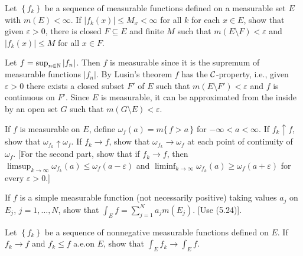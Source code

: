 \begin{problem}
  Let $\left\{f_k\right\}$ be a sequence of measurable functions defined on
  a measurable set $E$ with $m(E)<\infty$. If $|f_k(x)|\leq M_x<\infty$ for
  all $k$ for each $x\in E$, show that given $\varepsilon>0$, there is
  closed $F\subseteq E$ and finite $M$ such that
  $m(E\setminus F)<\varepsilon$ and $|f_k(x)|\leq M$ for all $x\in F$.
\end{problem}
\begin{solution}
  Let $f=\sup_{n\in\mathbb{N}}|f_n|$. Then $f$ is measurable since it is the
  supremum of measurable functions $|f_n|$. By Lusin's theorem $f$ has the
  $\mathcal{C}$-property, i.e., given $\varepsilon>0$ there exists a closed
  subset $F'$ of $E$ such that $m(E\setminus F')<\varepsilon$ and $f$ is
  continuous on $F'$. Since $E$ is measurable, it can be approximated from
  the inside by an open set $G$ such that $m(G\setminus E)<\varepsilon$.
\end{solution}

\begin{problem}
  If $f$ is measurable on $E$, define
  $\omega_f(a)=m\{\,f>a\,\}$ for $-\infty<a<\infty$. If
  $f_k\uparrow f$, show that $\omega_{f_k}\uparrow\omega_f$. If $f_k\to f$,
  show that $\omega_{f_k}\to\omega_f$ at each point of continuity of
  $\omega_f$. [For the second part, show that if $f_k\to f$, then
  $\limsup_{k\to\infty}\omega_{f_k}(a)\leq\omega_f(a-\varepsilon)$ and
  $\liminf_{k\to\infty}\omega_{f_k}(a)\geq\omega_f(a+\varepsilon)$ for
  every $\varepsilon>0$.]
\end{problem}
\begin{solution}

\end{solution}

\begin{problem}
  If $f$ is a simple measurable function (not necessarily positive) taking
  values $a_j$ on $E_j$, $j=1,\ldots,N$, show that
  $\int_E f=\sum_{j=1}^N a_jm(E_j)$. [Use (5.24)].
\end{problem}
\begin{solution}
\end{solution}

\begin{problem}
  Let $\left\{f_k\right\}$ be a sequence of nonnegative measurable
  functions defined on $E$. If $f_k\to f$ and $f_k\leq f$ a.e.\@ on $E$,
  show that $\int_E f_k\to\int_E f$.
\end{problem}
\begin{solution}
\end{solution}

